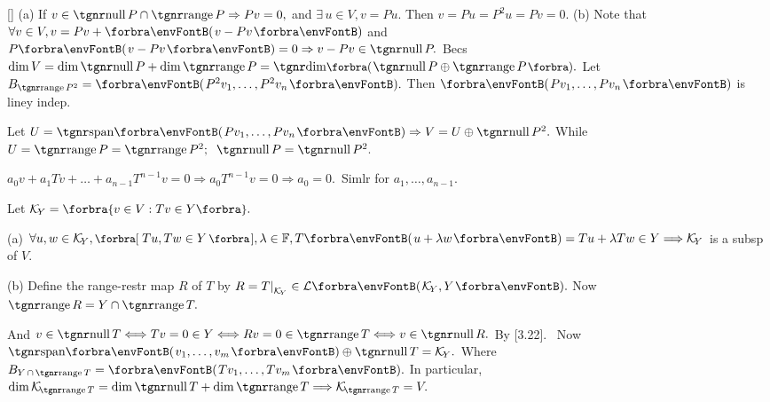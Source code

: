[\Sbra]{
}(a) If $v\in\null P\cap\range P\Rightarrow Pv=0,$ and $\exists\,u\in V,v=Pu.$ Then $v=Pu=P^2 u=Pv=0.$\parSol{}
(b) Note that $\forall v\in V,v=Pv+\Par{v-Pv}$ and $P\Par{v-Pv}=0\Rightarrow v-Pv\in\null P.$\parSol{\Hb}
\Or Becs $\dim V=\dim\null P+\dim\range P=\Dim\BigPar{\null P\oplus\range P}.$\PfEnd{\vspace{4pt}}\quad
\Or {} \;Let $B_{\range P^2}=\Par{P^2 v_1,\dots,P^2 v_n}.$ Then $\Par{Pv_1,\dots,Pv_n}$ is liney indep.\par\quad
Let $U=\Span{Pv_1,\dots,Pv_n}\Rightarrow V=U\oplus\null P^2.$ \;While $U=\range P=\range P^2;\;\;\null P=\null P^2.$\PfEnd
\SepLine

$a_0v+a_1Tv+\dots+a_{n-1}T^{n-1}v=0\Rightarrow a_0T^{n-1}v=0\Rightarrow a_0=0.$ \,Simlr for $a_1,\dots,a_{n-1}.$\PfEnd
\SepLine

Let $\mathcal{K}_{\!Y}=\Bra{v\in V: Tv\in Y}.$\par\quad
(a) $\forall u,w\in\mathcal{K}_{\!Y},\Sbra{\,Tu,Tw\in Y\,},\lambda\in\Fbb,T\Par{u+\lambda w}=Tu+\lambda Tw\in Y\Longrightarrow \mathcal{K}_{\!Y}$ is a subsp of $V.$\par\vspace{2pt}\quad
(b) Define the range-restr map $R$ of $T$ by $R=T\mmid_{\mathcal{K}_{\!Y}}\in\Lm{\mathcal{K}_{\!Y},Y}.$ Now $\range R=Y\cap \range T.$\par\quad\Hb
And $v\in\null T\Longleftrightarrow Tv=0\in Y\Longleftrightarrow Rv=0\in\range T\Longleftrightarrow v\in\null R.$ By [3.22].\PfEnd\vspace{2pt}
\Comment \,\,\,Now $\Span{v_1,\dots,v_m}\oplus\null T=\mathcal{K}_{\!Y}.$ {Where $B_{Y\,\cap\,\range T}=\Par{Tv_1,\dots,Tv_m}.$}\vspace{0pt}\parCom
In particular, $\dim\mathcal{K}_{\!\range T}=\dim\null T+\dim\range T\Longrightarrow\mathcal{K}_{\!\range T}=V.$
\SepLine

